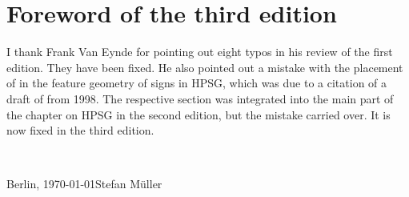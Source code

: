 
\section*{Foreword of the third edition}






I thank Frank Van Eynde for pointing out eight typos in his review of the first edition. They have
been fixed. He also pointed out a mistake with the placement of \argst in the feature geometry of
signs in HPSG, which was due to a citation of a draft of  from 1998. The respective
section was integrated into the main part of the chapter on HPSG in the second edition, but the
mistake carried over. It is now fixed in the third edition.

~\medskip

\noindent
Berlin, \today\hfill Stefan Müller




